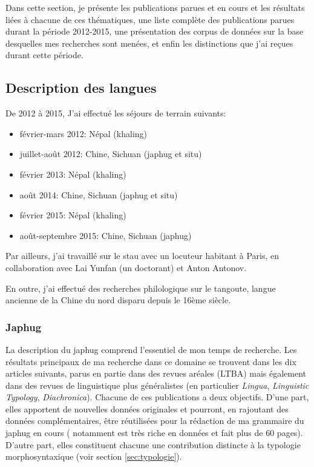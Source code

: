 \documentclass[oldfontcommands,oneside,a4paper,11pt]{article}
\begin{document}
Dans cette section, je présente les publications parues et en cours et les résultats liées à chacune de ces thématiques, une liste complète des publications parues durant la période 2012-2015, une présentation des corpus de données sur la base desquelles mes recherches sont menées, et enfin les distinctions que j'ai reçues durant cette période.

\subsection{Description des langues}
De 2012 à 2015, J'ai effectué les séjours de terrain suivants:

\begin{itemize}
\item février-mars 2012: Népal (khaling)
\item juillet-août 2012: Chine, Sichuan (japhug et situ)
\item février 2013: Népal (khaling)
\item août 2014: Chine, Sichuan (japhug et situ)
\item février 2015: Népal (khaling)
\item août-septembre 2015: Chine, Sichuan (japhug)
\end{itemize}

Par ailleurs, j'ai travaillé sur le stau avec un locuteur habitant à Paris, en collaboration avec Lai Yunfan (un doctorant) et Anton Antonov.


En outre, j'ai effectué des recherches philologique sur le tangoute, langue ancienne de la Chine du nord disparu depuis le 16ème siècle.

\subsubsection{Japhug} \label{sec:japhug}
La description du japhug comprend l'essentiel de mon temps de recherche. Les résultats principaux de ma recherche dans ce domaine se trouvent dans les dix articles suivants, parus en partie dans des revues aréales (LTBA) mais également dans des revues de linguistique plus généralistes (en particulier \textit{Lingua}, \textit{Linguistic Typology}, \textit{Diachronica}). Chacune de ces publications a deux objectifs. D'une part, elles apportent de nouvelles données originales et pourront, en rajoutant des données complémentaires, être réutilisées pour la rédaction de ma grammaire du japhug en cours (\citet{jacques14linking} notamment est très riche en données et fait plus de 60 pages). D'autre part, elles constituent chacune une contribution distincte à la typologie morphosyntaxique (voir section \ref{sec:typologie}).
\end{document}
